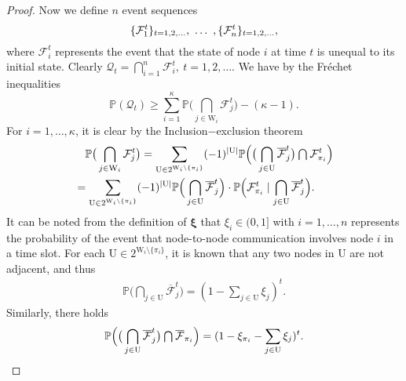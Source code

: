 \documentclass[a4paper, 11pt]{article}
\newcommand{\1}{\mathbf{1}}
\newcommand{\mW}{\mathrm{W}}
\newcommand{\mU}{\mathrm{U}}
\newcommand{\xib}{\bm{\xi}}
\newcommand*\mcap{\mathbin{\mathpalette\mcapinn\relax}}
\newcommand*\mcapinn[2]{\vcenter{\hbox{$\mathsurround=0pt
			\ifx\displaystyle#1\textstyle\else#1\fi\bigcap$}}}
\begin{document}
\begin{proof}
	Now we define $n$ event sequences
	\begin{equation}\notag
	\{\mathcal{F}^{t}_1\}_{t=1,2,\dots},\ \dots\ ,\{\mathcal{F}^{t}_n\}_{t=1,2,\dots},
	\end{equation}
	where $\mathcal{F}^{t}_i$ represents the event that the state of node $i$ at time $t$ is unequal to its initial state. Clearly $\mathcal{Q}_t = \bigcap\limits_{i=1}^n \mathcal{F}_i^{t},\ t=1,2,\dots.$
	We have by the Fr{\'e}chet inequalities
	\begin{equation}\label{eq:frechet1}
	\mathbb{P}(\mathcal{Q}_t)\ge\sum\limits_{i=1}^\kappa \mathbb{P}\Big(\bigcap\limits_{j\in\mW_i}\mathcal{F}_j^{t}\Big)-(\kappa-1).
	\end{equation}
	For $i=1,\dots,\kappa$, it is clear by the Inclusion$-$exclusion theorem \cite{allenby2011}
	\begin{equation}
	\begin{aligned}
	&\quad\mathbb{P}\big(\bigcap\limits_{j\in\mW_i}\mathcal{F}_j^{t}\big)=\sum\limits_{\mU\in2^{\mW_i\setminus\{\pi_i\}}}(-1)^{\left|\mU\right|}\mathbb{P}\Big(\big(\bigcap\limits_{j\in\mU} \overline{\mathcal{F}}_j^{t}\big)\mcap \mathcal{F}_{\pi_i}^{t}\Big)\\
	&=\sum\limits_{\mU\in2^{\mW_i\setminus\{\pi_i\}}}(-1)^{\left|\mU\right|}\mathbb{P}\Big(\bigcap\limits_{j\in\mU} \overline{\mathcal{F}}_j^{t}\Big)\cdot
	\mathbb{P}\Big(\mathcal{F}_{\pi_i}^{t}\mid\bigcap\limits_{j\in\mU} \overline{\mathcal{F}}_j^{t}\Big).\label{eq:minusoneU}
	\end{aligned}
	\end{equation}
	It can be noted from the definition of $\xib$ that $\xi_i\in(0,1]$ with $i=1,\dots,n$ represents the probability of the event that node-to-node communication involves node $i$ in a time slot. For each $\mU\in2^{\mW_i\setminus\{\pi_i\}}$, it is known that any two nodes in $\mU$ are not adjacent, and thus
	\begin{align}
	\mathbb{P}\Big(\bigcap\limits_{j\in\mU} \overline{\mathcal{F}}_j^{t}\Big) = (1-\sum\limits_{j\in\mU}\xi_j)^t.\label{eq:prior1}
	\end{align}
	Similarly, there holds
	\begin{equation}\label{eq:joint1}
	\mathbb{P}\Big(\big(\bigcap\limits_{j\in\mU} \overline{\mathcal{F}}_j^{t}\big)\mcap\overline{\mathcal{F}}_{\pi_i}\Big) = (1-\xi_{\pi_i}-\sum\limits_{j\in\mU}\xi_j)^t.

\end{equation}
\end{proof}
\end{document}
